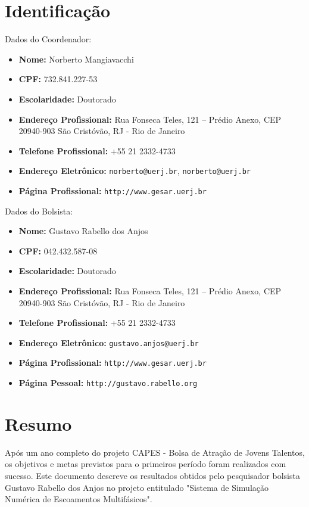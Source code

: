 \documentclass[a4paper,portuges]{article}
\begin{document}
	


\section{Identificação}

\noindent Dados do Coordenador: 
\begin{itemize}
	\item \textbf{Nome:} Norberto Mangiavacchi
	\item \textbf{CPF:} 732.841.227-53
	\item \textbf{Escolaridade:} Doutorado
	\item \textbf{Endereço Profissional:} Rua Fonseca Teles, 121 --
	Prédio Anexo, CEP 20940-903 São Cristóvão, RJ - Rio de Janeiro
	\item \textbf{Telefone Profissional:} +55 21 2332-4733
	\item \textbf{Endereço Eletrônico:} {\tt norberto@uerj.br}, 
	                                    {\tt norberto@uerj.br}
	\item \textbf{Página Profissional:} {\tt http://www.gesar.uerj.br}
\end{itemize}

\hspace{1cm}

\noindent Dados do Bolsista: 
\begin{itemize}
	\item \textbf{Nome:} Gustavo Rabello dos Anjos
	\item \textbf{CPF:} 042.432.587-08
	\item \textbf{Escolaridade:} Doutorado
	\item \textbf{Endereço Profissional:} Rua Fonseca Teles, 121 --
	Prédio Anexo, CEP 20940-903 São Cristóvão, RJ - Rio de Janeiro
	\item \textbf{Telefone Profissional:} +55 21 2332-4733
	\item \textbf{Endereço Eletrônico:} {\tt gustavo.anjos@uerj.br}
	\item \textbf{Página Profissional:} {\tt http://www.gesar.uerj.br}
	\item \textbf{Página Pessoal:} {\tt http://gustavo.rabello.org}
\end{itemize}

\clearpage

\section{Resumo}
Após um ano completo do projeto CAPES - Bolsa de Atração de Jovens
Talentos, os objetivos e metas previstos para o primeiros período foram
realizados com sucesso. Este documento descreve os resultados obtidos
pelo pesquisador bolsista Gustavo Rabello dos Anjos no projeto
entitulado "Sistema de Simulação Numérica de Escoamentos Multifásicos". 
\clearpage
\end{document}
